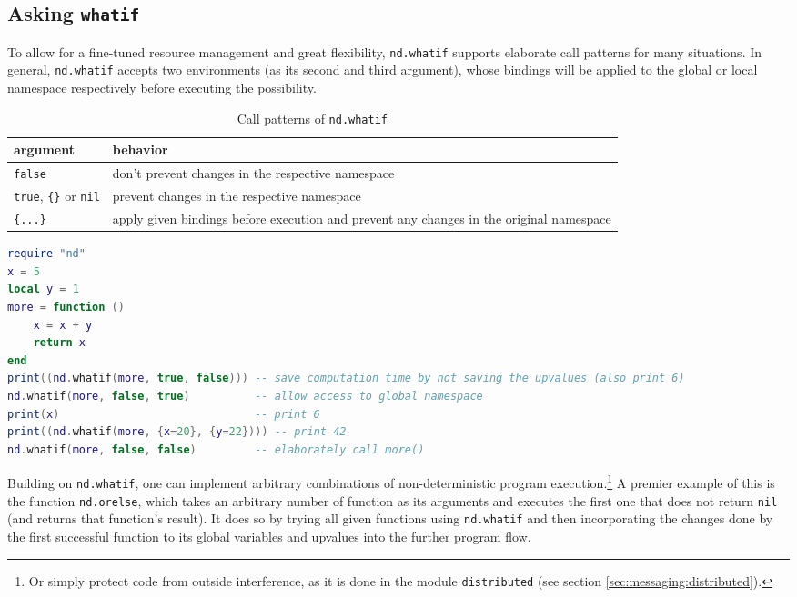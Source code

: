 \subsection{Asking \texttt{whatif}}
\label{sec:whatif}

To allow for a fine-tuned resource management and great flexibility, \texttt{nd.whatif} supports elaborate call patterns for many situations. In general, \texttt{nd.whatif} accepts two environments (as its second and third argument), whose bindings will be applied to the global or local namespace respectively before executing the possibility.

\begin{comment}
TODO: update nd.whatif to include an option (_true_ or nil?) to ERADICATE said namespace and execute in plain environment.
\end{comment}

 \begin{table}[h]
 \caption{Call patterns of \texttt{nd.whatif}}
 \begin{tabular}{|l|p{300pt}|}
\hline
argument  & behavior\\
\hline
\hline
\texttt{false} & don't prevent changes in the respective namespace\\
\hline
\texttt{true}, \texttt{\{\}} or \texttt{nil} & prevent changes in the respective namespace \\
\hline
\texttt{\{...\}} & apply given bindings before execution and prevent any changes in the original namespace\\
\hline
 \end{tabular}
 \label{tab:whatif}
 \end{table}

\begin{lstlisting}[language=lua, caption={Example for the call patterns of \texttt{nd.whatif} (see table \ref{tab:whatif})}, label=lst:whatif, name=lst:whatif]
require "nd"
x = 5
local y = 1
more = function ()
	x = x + y
	return x
end
print((nd.whatif(more, true, false))) -- save computation time by not saving the upvalues (also print 6)
nd.whatif(more, false, true)          -- allow access to global namespace
print(x)                              -- print 6
print((nd.whatif(more, {x=20}, {y=22}))) -- print 42
nd.whatif(more, false, false)         -- elaborately call more()
\end{lstlisting}

Building on \texttt{nd.whatif}, one can implement arbitrary combinations of non-deterministic program execution.\footnote{Or simply protect code from outside interference, as it is done in the module \texttt{distributed} (see section \ref{sec:messaging:distributed}).} A premier example of this is the function \texttt{nd.orelse}, which takes an arbitrary number of function as its arguments and executes the first one that does not return \texttt{nil} (and returns that function's result). It does so by trying all given functions using \texttt{nd.whatif} and then incorporating the changes done by the first successful function to its global variables and upvalues into the further program flow.


